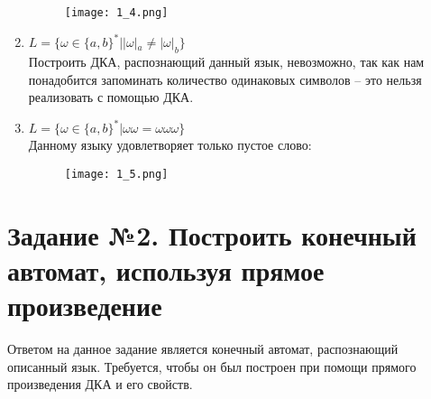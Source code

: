 \documentclass[12pt, a4paper]{article}
\begin{document}
\begin{enumerate}
    \begin{figure}[H]
        \centering
        \texttt{[image: 1\_4.png]}
    \end{figure}
    \item \(L=\{\omega\in\{a,b\}^* | |\omega|_a \neq |\omega|_b \} \)
\\Построить ДКА, распознающий данный язык, невозможно, так как нам понадобится запоминать количество одинаковых символов -- это нельзя реализовать с помощью ДКА.
    \item \(L=\{\omega\in\{a,b\}^* | \omega\omega = \omega\omega\omega \} \)
\\Данному языку удовлетворяет только пустое слово:
\begin{comment}
digraph {
    rankdir="LR"
    "" [shape=point]
    q1 [shape=doublecircle]
    
    "" -> q1
} 
\end{comment}

    \begin{figure}[H]
        \centering
        \texttt{[image: 1\_5.png]}
    \end{figure}
\end{enumerate}


\section{Задание №2. Построить конечный автомат, используя прямое произведение}%
Ответом на данное задание является конечный автомат, распознающий описанный язык. Требуется, чтобы он был построен при помощи прямого произведения ДКА и его свойств.
\end{document}
